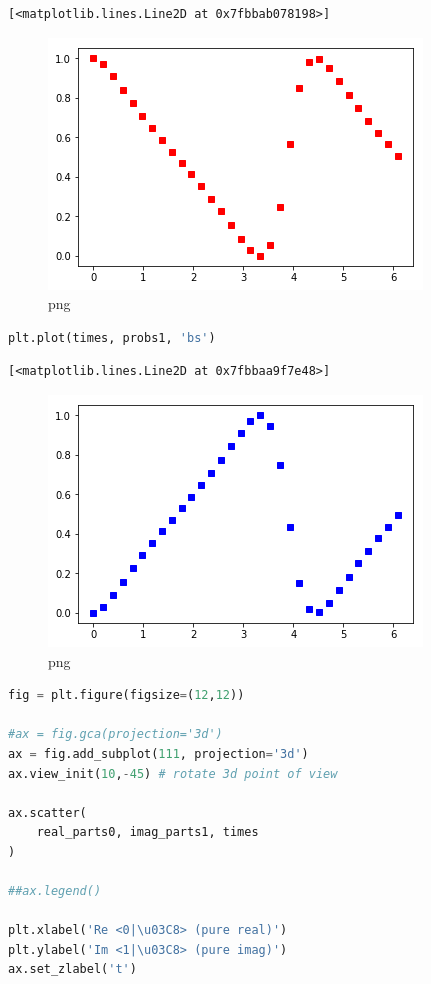 \begin{lstlisting}
[<matplotlib.lines.Line2D at 0x7fbbab078198>]
\end{lstlisting}

\begin{figure}
\centering
\includegraphics[width=0.66\linewidth]{output_83_1.png}
\caption{png}
\end{figure}

\begin{lstlisting}[language=Python]
plt.plot(times, probs1, 'bs')
\end{lstlisting}

\begin{lstlisting}
[<matplotlib.lines.Line2D at 0x7fbbaa9f7e48>]
\end{lstlisting}

\begin{figure}
\centering
\includegraphics[width=0.66\linewidth]{output_84_1.png}
\caption{png}
\end{figure}

\begin{lstlisting}[language=Python]
fig = plt.figure(figsize=(12,12))

#ax = fig.gca(projection='3d')
ax = fig.add_subplot(111, projection='3d')
ax.view_init(10,-45) # rotate 3d point of view

ax.scatter(
    real_parts0, imag_parts1, times
)

##ax.legend()

plt.xlabel('Re <0|\u03C8> (pure real)')
plt.ylabel('Im <1|\u03C8> (pure imag)')
ax.set_zlabel('t')
\end{lstlisting}

